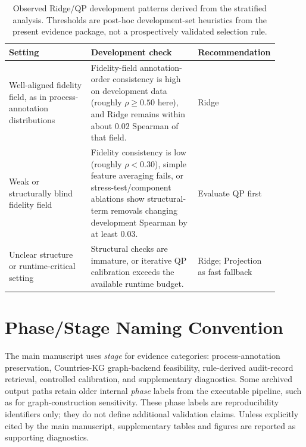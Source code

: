 \documentclass[pdflatex,sn-mathphys-num]{sn-jnl}
\begin{document}
\begin{table}[ht]
\caption{Observed Ridge/QP development patterns derived from the stratified analysis. Thresholds are post-hoc development-set heuristics from the present evidence package, not a prospectively validated selection rule.}
\label{tab:variant-policy-supp}
\centering
\small
\renewcommand{\arraystretch}{1.08}
\begin{tabular}{Z{0.32\linewidth}Z{0.42\linewidth}Z{0.16\linewidth}}
\toprule
\textbf{Setting} & \textbf{Development check} & \textbf{Recommendation} \\
\midrule
Well-aligned fidelity field, as in process-annotation distributions & Fidelity-field annotation-order consistency is high on development data (roughly $\rho \ge 0.50$ here), and Ridge remains within about 0.02 Spearman of that field. & Ridge \\
Weak or structurally blind fidelity field & Fidelity consistency is low (roughly $\rho < 0.30$), simple feature averaging fails, or stress-test/component ablations show structural-term removals changing development Spearman by at least 0.03. & Evaluate QP first \\
Unclear structure or runtime-critical setting & Structural checks are immature, or iterative QP calibration exceeds the available runtime budget. & Ridge; Projection as fast fallback \\
\bottomrule
\end{tabular}
\end{table}


\section*{Phase/Stage Naming Convention}
The main manuscript uses \emph{stage} for evidence categories: process-annotation preservation, Countries-KG graph-backend feasibility, rule-derived audit-record retrieval, controlled calibration, and supplementary diagnostics. Some archived output paths retain older internal \emph{phase} labels from the executable pipeline, such as  for graph-construction sensitivity. These phase labels are reproducibility identifiers only; they do not define additional validation claims. Unless explicitly cited by the main manuscript, supplementary tables and figures are reported as supporting diagnostics.

\appendix
\makeatletter
\renewcommand{\thetable}{\@Alph\c@section.\arabic{table}}
\renewcommand{\thefigure}{\@Alph\c@section.\arabic{figure}}
\renewcommand{\thealgorithm}{\@Alph\c@section.\arabic{algorithm}}
\renewcommand{\theequation}{\@Alph\c@section.\arabic{equation}}
\makeatother
\end{document}
